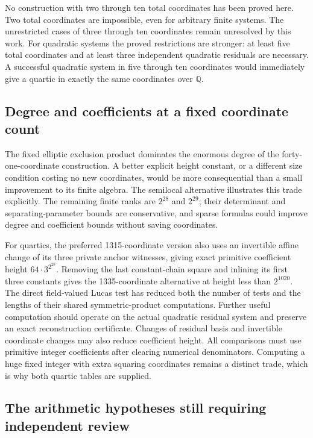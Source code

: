 No construction with two through ten total coordinates has been proved
here. Two total coordinates are impossible, even for arbitrary finite
systems. The unrestricted cases of three through ten coordinates remain
unresolved by this work. For quadratic systems the proved restrictions
are stronger: at least five total coordinates and at least three
independent quadratic residuals are necessary. A successful quadratic
system in five through ten coordinates would immediately give a
quartic in exactly the same coordinates over $\mathbb Q$.

\subsection{Degree and coefficients at a fixed coordinate count}

The fixed elliptic exclusion product dominates the enormous degree of
the forty-one-coordinate construction. A better explicit height
constant, or a different size condition costing no new coordinates,
would be more consequential than a small improvement to its finite
algebra. The semilocal alternative illustrates this trade explicitly.
The remaining finite ranks are $2^{28}$ and $2^{29}$; their determinant
and separating-parameter bounds are conservative, and sparse formulas
could improve degree and coefficient bounds without saving coordinates.

For quartics, the preferred 1315-coordinate version also uses an
invertible affine change of its three private anchor witnesses, giving
exact primitive coefficient height $64\cdot3^{2^{28}}$. Removing the
last constant-chain square and inlining its first three constants gives
the 1335-coordinate alternative at height less than $2^{1020}$.
The direct field-valued Lucas test has reduced both the
number of tests and the lengths of their shared symmetric-product
computations. Further useful computation should operate on the actual
quadratic residual system and preserve an exact reconstruction
certificate. Changes of residual basis and invertible coordinate
changes may also reduce coefficient height. All comparisons must use
primitive integer coefficients after clearing numerical denominators.
Computing a huge fixed integer with extra squaring coordinates remains
a distinct trade, which is why both quartic tables are supplied.

\subsection{The arithmetic hypotheses still requiring independent review}

